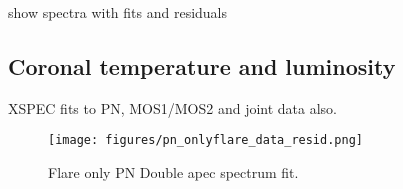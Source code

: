 \documentclass[twocolumn]{aastex631}
\begin{document}
show spectra with fits and residuals







\subsection{Coronal temperature and luminosity}

\begin{table*}
\footnotesize
    \caption{XSPEC fits to PN, MOS1/MOS2 and joint data also.}
    
        \label{tab:specfit}
\end{table*}

\begin{figure}
    \begin{centering}
        \texttt{[image: figures/pn\_onlyflare\_data\_resid.png]}
        \caption{
         Flare only PN Double apec spectrum fit.
        }
        \label{fig:spec_pn_onlyflare}
    \end{centering}
\end{figure}
\end{document}
